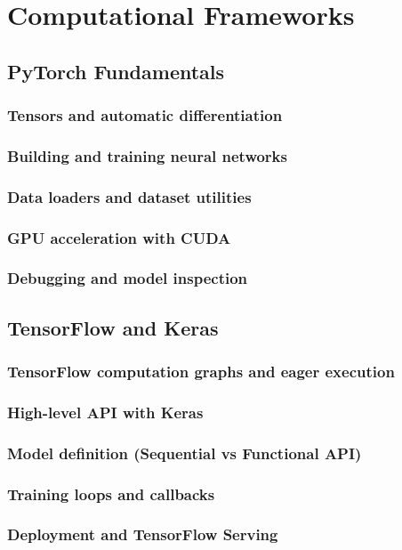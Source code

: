 ﻿\chapter{Computational Frameworks}
\section{PyTorch Fundamentals}
\subsection{Tensors and automatic differentiation}
\subsection{Building and training neural networks}
\subsection{Data loaders and dataset utilities}
\subsection{GPU acceleration with CUDA}
\subsection{Debugging and model inspection}

\section{TensorFlow and Keras}
\subsection{TensorFlow computation graphs and eager execution}
\subsection{High-level API with Keras}
\subsection{Model definition (Sequential vs Functional API)}
\subsection{Training loops and callbacks}
\subsection{Deployment and TensorFlow Serving}

